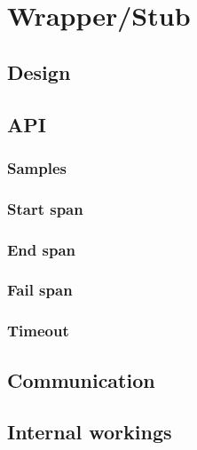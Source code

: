\chapter{Wrapper/Stub}
    \section{Design}
    \section{API}
        \subsection{Samples}
        \subsection{Start span}
        \subsection{End span}
        \subsection{Fail span}
        \subsection{Timeout}
        
    \section{Communication}
    \section{Internal workings}

